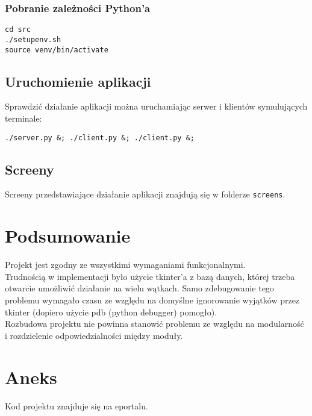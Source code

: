 \documentclass[12pt,a4paper]{article}
\begin{document}
\subsubsection{Pobranie zależności Python'a}
\begin{verbatim}
cd src
./setupenv.sh
source venv/bin/activate
\end{verbatim}

\subsection{Uruchomienie aplikacji}
Sprawdzić działanie aplikacji można uruchamiając serwer i klientów symulujących terminale:
\begin{verbatim}
./server.py &; ./client.py &; ./client.py &;
\end{verbatim}

\subsection{Screeny}
Screeny przedstawiające działanie aplikacji znajdują się w folderze \texttt{screens}.

\section{Podsumowanie}
Projekt jest zgodny ze wszystkimi wymaganiami funkcjonalnymi.\\
Trudnością w implementacji było użycie tkinter'a z bazą danych, której trzeba otwarcie umożliwić działanie na wielu wątkach. Samo zdebugowanie tego problemu wymagało czasu ze względu na domyślne ignorowanie wyjątków przez tkinter (dopiero użycie pdb (python debugger) pomogło).\\
Rozbudowa projektu nie powinna stanowić problemu ze względu na modularność i rozdzielenie odpowiedzialności między moduły.
\section{Aneks}
Kod projektu znajduje się na eportalu.
\end{document}
